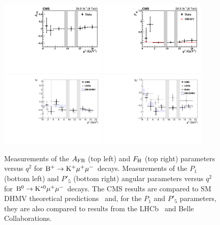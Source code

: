 \documentclass{PoS}
\begin{document}
\begin{figure}[htb]
\centering
\includegraphics[width=0.45\textwidth]{figures/CMS-BPH-15-001_Figure_005-a}
\includegraphics[width=0.45\textwidth]{figures/CMS-BPH-15-001_Figure_005-b}\\
\includegraphics[width=0.45\textwidth]{figures/CMS-BPH-15-008_Figure_003-a}
\includegraphics[width=0.45\textwidth]{figures/CMS-BPH-15-008_Figure_003-b}
\caption{
  Measurements of the $A_{\rm FB}$ (top left) and $F_{\rm H}$ (top right)
  parameters versus $q^2$ for ${\rm B^+ \to K^+\mu^+\mu^-}$ decays. Measurements of
  the $P_1$ (bottom left) and $P'_5$ (bottom right) angular parameters versus
  $q^2$ for ${\rm B^0 \to K^{*0}\mu^+\mu^-}$ decays. The CMS results are compared to
  SM  DHMV theoretical predictions~\cite{Descotes-Genon:2014uoa,Descotes-Genon:2015uva}
  and, for the $P_1$ and $P'_5$ parameters, they are also compared to results
  from the LHCb~\cite{LHCb} and Belle~\cite{Belle} Collaborations.
}
\label{fig:BPH-15-001_Figure_005__BPH-15-008_Figure003}
\end{figure}
\end{document}
